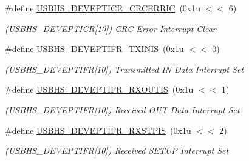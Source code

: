 \begin{DoxyCompactItemize}
\mbox{\label{group__SAMS70__USBHS_ga113daf9e53959a559925a35d5e5fd7cd}} 
\#define \mbox{\hyperlink{group__SAMS70__USBHS_ga113daf9e53959a559925a35d5e5fd7cd}{U\+S\+B\+H\+S\+\_\+\+D\+E\+V\+E\+P\+T\+I\+C\+R\+\_\+\+C\+R\+C\+E\+R\+R\+IC}}~(0x1u $<$$<$ 6)
\begin{DoxyCompactList}\small\item\em (U\+S\+B\+H\+S\+\_\+\+D\+E\+V\+E\+P\+T\+I\+CR\mbox{[}10\mbox{]}) C\+RC Error Interrupt Clear \end{DoxyCompactList}\item 
\mbox{\label{group__SAMS70__USBHS_gad5da0b534cb39cd8d5476f606569a6d6}} 
\#define \mbox{\hyperlink{group__SAMS70__USBHS_gad5da0b534cb39cd8d5476f606569a6d6}{U\+S\+B\+H\+S\+\_\+\+D\+E\+V\+E\+P\+T\+I\+F\+R\+\_\+\+T\+X\+I\+N\+IS}}~(0x1u $<$$<$ 0)
\begin{DoxyCompactList}\small\item\em (U\+S\+B\+H\+S\+\_\+\+D\+E\+V\+E\+P\+T\+I\+FR\mbox{[}10\mbox{]}) Transmitted IN Data Interrupt Set \end{DoxyCompactList}\item 
\mbox{\label{group__SAMS70__USBHS_gaef3d6bfad543d172ba059744c175190e}} 
\#define \mbox{\hyperlink{group__SAMS70__USBHS_gaef3d6bfad543d172ba059744c175190e}{U\+S\+B\+H\+S\+\_\+\+D\+E\+V\+E\+P\+T\+I\+F\+R\+\_\+\+R\+X\+O\+U\+T\+IS}}~(0x1u $<$$<$ 1)
\begin{DoxyCompactList}\small\item\em (U\+S\+B\+H\+S\+\_\+\+D\+E\+V\+E\+P\+T\+I\+FR\mbox{[}10\mbox{]}) Received O\+UT Data Interrupt Set \end{DoxyCompactList}\item 
\mbox{\label{group__SAMS70__USBHS_ga974795f10c7e14d470d001c948a74803}} 
\#define \mbox{\hyperlink{group__SAMS70__USBHS_ga974795f10c7e14d470d001c948a74803}{U\+S\+B\+H\+S\+\_\+\+D\+E\+V\+E\+P\+T\+I\+F\+R\+\_\+\+R\+X\+S\+T\+P\+IS}}~(0x1u $<$$<$ 2)
\begin{DoxyCompactList}\small\item\em (U\+S\+B\+H\+S\+\_\+\+D\+E\+V\+E\+P\+T\+I\+FR\mbox{[}10\mbox{]}) Received S\+E\+T\+UP Interrupt Set \end{DoxyCompactList}\item 
\mbox{\label{group__SAMS70__USBHS_ga7a7af5d0054bf3e037f35ccc1c952906}} 

\end{DoxyCompactItemize}
